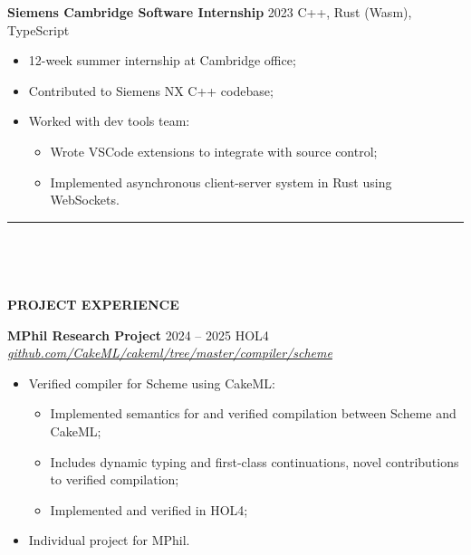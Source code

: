 \documentclass[
  11pt,
  a4paper,
]{article}
\providecommand{\tightlist}{%
  \setlength{\itemsep}{0pt}\setlength{\parskip}{0pt}}
\newcommand{\itemspace}{0.8ex}
\newcommand{\ruledheader}[2]{%
\begingroup
\setlength{\fboxsep}{0pt}%
\colorbox{#1}{%
\parbox[b][1.2ex][t]{35mm}{\begin{tiny}\ \end{tiny}}}%
\parbox[b][1.2ex][t]{5mm}{\begin{tiny}\ \end{tiny}}%
\uppercase{\textbf{#2}}
\endgroup}
\begin{document}
\textbf{Siemens Cambridge Software Internship} \textbar{} 2023
\textbar{} C++, Rust (Wasm), TypeScript

\begin{itemize}
\tightlist
\item
  12-week summer internship at Cambridge office;
\item
  Contributed to Siemens NX C++ codebase;
\item
  Worked with dev tools team:

  \begin{itemize}
  \tightlist
  \item
    Wrote VSCode extensions to integrate with source control;
  \item
    Implemented asynchronous client-server system in Rust using
    WebSockets.
  \end{itemize}
\end{itemize}

\begin{Large}

\vspace{-1.5ex}\rule{\textwidth}{0.8pt}\vspace{2ex}

\ruledheader{cyan!50!teal}{Project experience}\end{Large}

\vspace{\itemspace}

\textbf{MPhil Research Project} \textbar{} 2024 – 2025 \textbar{} HOL4
\textbar{}
\href{https://github.com/CakeML/cakeml/tree/master/compiler/scheme}{\emph{github.com/CakeML/cakeml/tree/master/compiler/scheme}}

\begin{itemize}
\tightlist
\item
  Verified compiler for Scheme using CakeML:

  \begin{itemize}
  \tightlist
  \item
    Implemented semantics for and verified compilation between Scheme
    and CakeML;
  \item
    Includes dynamic typing and first-class continuations, novel
    contributions to verified compilation;
  \item
    Implemented and verified in HOL4;
  \end{itemize}
\item
  Individual project for MPhil.
\end{itemize}
\end{document}
